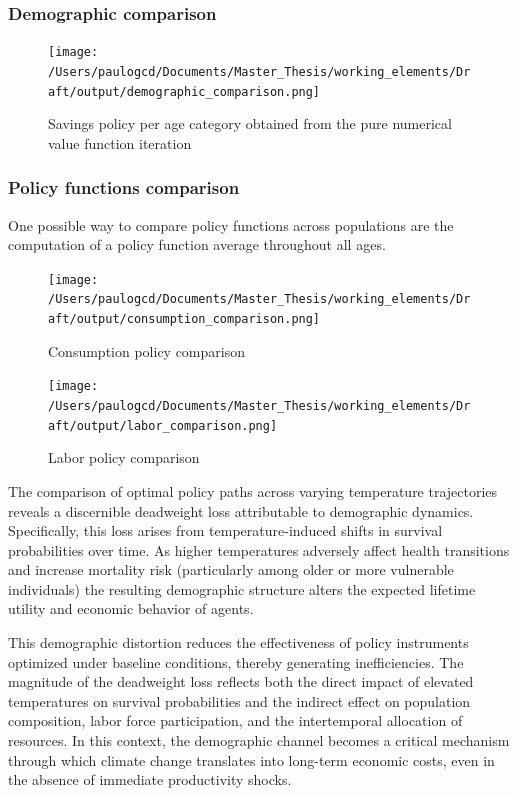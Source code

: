 \documentclass{article}
\begin{document}
\subsubsection{Demographic comparison}

\begin{figure}[H]
    \texttt{[image: /Users/paulogcd/Documents/Master\_Thesis/working\_elements/Draft/output/demographic\_comparison.png]}
    \caption{Savings policy per age category obtained from the pure numerical value function iteration}
\end{figure}

\subsubsection{Policy functions comparison}

One possible way to compare policy functions across populations are 
the computation of a policy function average throughout all ages. 

\begin{figure}[H]
    \texttt{[image: /Users/paulogcd/Documents/Master\_Thesis/working\_elements/Draft/output/consumption\_comparison.png]}
    \caption{Consumption policy comparison}
\end{figure}

\begin{figure}[H]
    \texttt{[image: /Users/paulogcd/Documents/Master\_Thesis/working\_elements/Draft/output/labor\_comparison.png]}
    \caption{Labor policy comparison}
\end{figure}

The comparison of optimal policy paths across varying temperature trajectories reveals a discernible deadweight loss attributable to demographic dynamics.
Specifically, this loss arises from temperature-induced shifts in survival probabilities over time.
As higher temperatures adversely affect health transitions and increase mortality risk (particularly among older or more vulnerable individuals) the resulting demographic structure alters the expected lifetime utility and economic behavior of agents.

This demographic distortion reduces the effectiveness of policy instruments optimized under baseline conditions, thereby generating inefficiencies.
The magnitude of the deadweight loss reflects both the direct impact of elevated temperatures on survival probabilities and the indirect effect on population composition, labor force participation, and the intertemporal allocation of resources. In this context, the demographic channel becomes a critical mechanism through which climate change translates into long-term economic costs, even in the absence of immediate productivity shocks.
\end{document}
